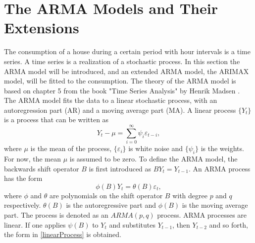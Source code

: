 \section{The ARMA Models and Their Extensions}
The consumption of a house during a certain period with hour intervals is a time series. A time series is a realization of a stochastic process. In this section the ARMA model will be introduced, and an extended ARMA model, the ARIMAX model, will be fitted to the consumption. The theory of the ARMA model is based on chapter 5 from the book "Time Series Analysis" by Henrik Madsen \cite{Time_Series_Analysis}. The ARMA model fits the data to a linear stochastic process, with an autoregression part (AR) and a moving average part (MA). A linear process $\{Y_t\}$ is a process that can be written as
\begin{equation}
    Y_t - \mu = \sum_{i=0}^{\infty} \psi_i \varepsilon_{t-i}, \label{linearProcess}
\end{equation}
where $\mu$ is the mean of the process, $\{\varepsilon_i\}$ is white noise and $\{\psi_i\}$ is the weights. For now, the mean $\mu$ is assumed to be zero. To define the ARMA model, the backwards shift operator $B$ is first introduced as $BY_t = Y_{t-1}$. An ARMA process has the form
\begin{equation}
    \phi (B)Y_t = \theta (B) \varepsilon_t,
\end{equation}
where $\phi$ and $\theta$ are polynomials on the shift operator $B$ with degree $p$ and $q$ respectively. $\theta(B)$ is the autoregressive part and $\phi(B)$ is the moving average part. The process is denoted as an $ARMA(p,q)$ process. ARMA processes are linear. If one applies $\psi(B)$ to $Y_t$ and substitutes $Y_{t-1}$, then $Y_{t-2}$ and so forth, the form in \cref{linearProcess} is obtained.

